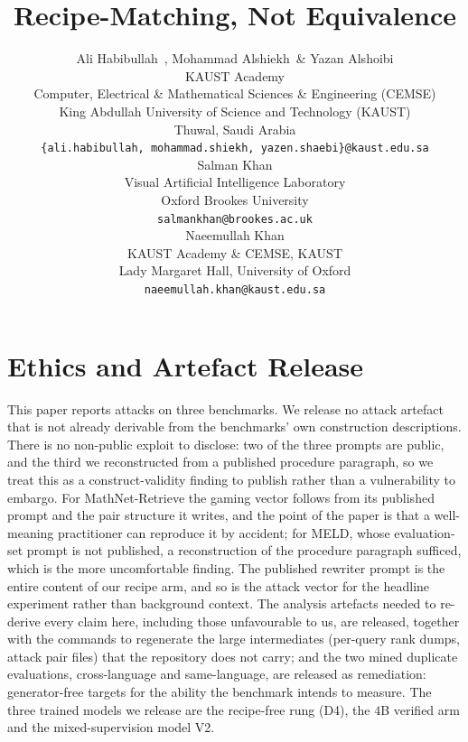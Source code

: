 \documentclass{article}
\title{Recipe-Matching, Not Equivalence}
\author{%
  Ali Habibullah\footnotemark[2]\ , Mohammad Alshiekh\footnotemark[1] \ \& Yazan Alshoibi\footnotemark[1] \\
  KAUST Academy \\
  Computer, Electrical \& Mathematical Sciences \& Engineering (CEMSE) \\
  King Abdullah University of Science and Technology (KAUST) \\
  Thuwal, Saudi Arabia \\
  \texttt{\{ali.habibullah, mohammad.shiekh, yazen.shaebi\}@kaust.edu.sa} \\
  \AND
  Salman Khan \\
  Visual Artificial Intelligence Laboratory \\
  Oxford Brookes University \\
  \texttt{salmankhan@brookes.ac.uk} \\
  \And
  Naeemullah Khan \\
  KAUST Academy \& CEMSE, KAUST \\
  Lady Margaret Hall, University of Oxford \\
  \texttt{naeemullah.khan@kaust.edu.sa}
}
\begin{document}
\maketitle
{\renewcommand{\thefootnote}{\fnsymbol{footnote}}%
 }












\section*{Ethics and Artefact Release}
This paper reports attacks on three benchmarks. We release no attack artefact that is not already derivable from the benchmarks' own construction descriptions. There is no non-public exploit to disclose: two of the three prompts are public, and the third we reconstructed from a published procedure paragraph, so we treat this as a construct-validity finding to publish rather than a vulnerability to embargo. For MathNet-Retrieve the gaming vector follows from its published prompt and the pair structure it writes, and the point of the paper is that a well-meaning practitioner can reproduce it by accident; for MELD, whose evaluation-set prompt is not published, a reconstruction of the procedure paragraph sufficed, which is the more uncomfortable finding. The published rewriter prompt is the entire content of our recipe arm, and so is the attack vector for the headline experiment rather than background context. The analysis artefacts needed to re-derive every claim here, including those unfavourable to us, are released, together with the commands to regenerate the large intermediates (per-query rank dumps, attack pair files) that the repository does not carry; and the two mined duplicate evaluations, cross-language and same-language, are released as remediation: generator-free targets for the ability the benchmark intends to measure. The three trained models we release are the recipe-free rung (D4), the $4$B verified arm and the mixed-supervision model V2.
\end{document}
